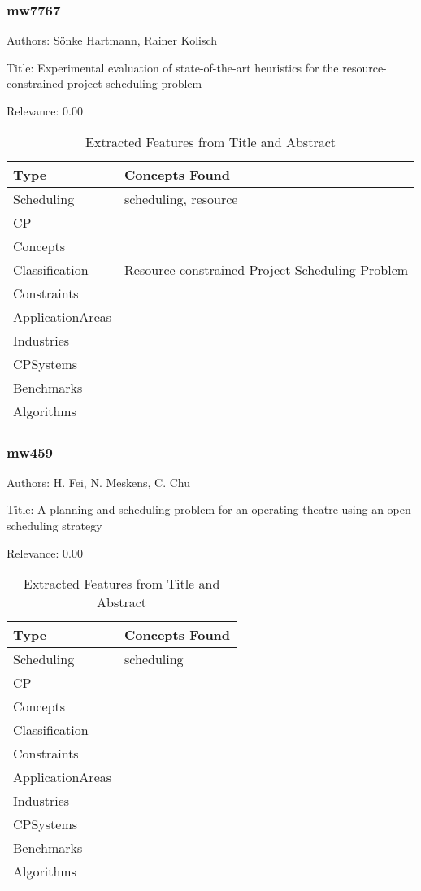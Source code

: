 \subsubsection{mw7767}
\label{mw:mw7767}

Authors: Sönke Hartmann, Rainer Kolisch

Title: Experimental evaluation of state-of-the-art heuristics for the resource-constrained project scheduling problem

Relevance:  0.00

{\scriptsize
\begin{longtable}{p{2cm}p{20cm}}
\caption{Extracted Features from Title and Abstract}\\ \toprule
Type & Concepts Found\\ \midrule
\endhead
\bottomrule
\endfoot
Scheduling & scheduling, resource\\ 
CP & \\ 
Concepts & \\ 
Classification & Resource-constrained Project Scheduling Problem\\ 
Constraints & \\ 
ApplicationAreas & \\ 
Industries & \\ 
CPSystems & \\ 
Benchmarks & \\ 
Algorithms & \\ 
\end{longtable}
}



\subsubsection{mw459}
\label{mw:mw459}

Authors: H. Fei, N. Meskens, C. Chu

Title: A planning and scheduling problem for an operating theatre using an open scheduling strategy

Relevance:  0.00

{\scriptsize
\begin{longtable}{p{2cm}p{20cm}}
\caption{Extracted Features from Title and Abstract}\\ \toprule
Type & Concepts Found\\ \midrule
\endhead
\bottomrule
\endfoot
Scheduling & scheduling\\ 
CP & \\ 
Concepts & \\ 
Classification & \\ 
Constraints & \\ 
ApplicationAreas & \\ 
Industries & \\ 
CPSystems & \\ 
Benchmarks & \\ 
Algorithms & \\ 
\end{longtable}
}



